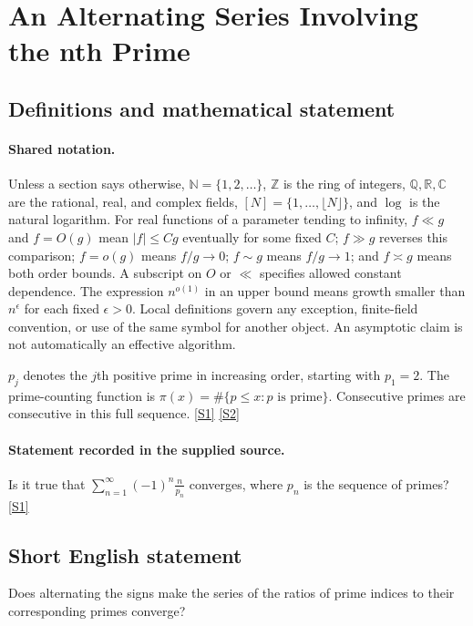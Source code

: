 \documentclass[11pt,a4paper]{article}
\newcommand{\N}{\mathbb{N}}
\newcommand{\Z}{\mathbb{Z}}
\newcommand{\Q}{\mathbb{Q}}
\newcommand{\R}{\mathbb{R}}
\newcommand{\C}{\mathbb{C}}
\newcommand{\sref}[2]{\hyperlink{source:#1:#2}{[S#2]}}
\begin{document}
\section{An Alternating Series Involving the nth Prime}\label{statement}


\subsection{Definitions and mathematical statement}

\paragraph{Shared notation.}Unless a section says otherwise, $\N=\{1,2,\ldots\}$,
$\Z$ is the ring of integers, $\Q,\R,\C$ are the rational, real, and complex
fields, $[N]=\{1,\ldots,\lfloor N\rfloor\}$, and $\log$ is the natural
logarithm. For real functions of a parameter tending to infinity,
$f\ll g$ and $f=O(g)$ mean $|f|\leq Cg$ eventually for some fixed $C$;
$f\gg g$ reverses this comparison; $f=o(g)$ means $f/g\to0$;
$f\sim g$ means $f/g\to1$; and $f\asymp g$ means both order bounds.
A subscript on $O$ or $\ll$ specifies allowed constant dependence.
The expression $n^{o(1)}$ in an upper bound means growth smaller than
$n^\epsilon$ for each fixed $\epsilon>0$. Local definitions govern any
exception, finite-field convention, or use of the same symbol for another
object. An asymptotic claim is not automatically an effective algorithm.



$p_j$ denotes the $j$th positive prime in increasing order, starting with $p_1=2$. The prime-counting function is $\pi(x)=\#\{p\leq x:p\text{ is prime}\}$. Consecutive primes are consecutive in this full sequence. \sref{statement}{1} \sref{statement}{2}

\paragraph{Statement recorded in the supplied source.}
Is it true that $ \sum_{n=1}^\infty(-1)^n\frac{n}{p_n} $ converges, where $p_n$ is the sequence of primes? \sref{statement}{1}

\subsection{Short English statement}

Does alternating the signs make the series of the ratios of prime indices to their corresponding primes converge?
\end{document}
